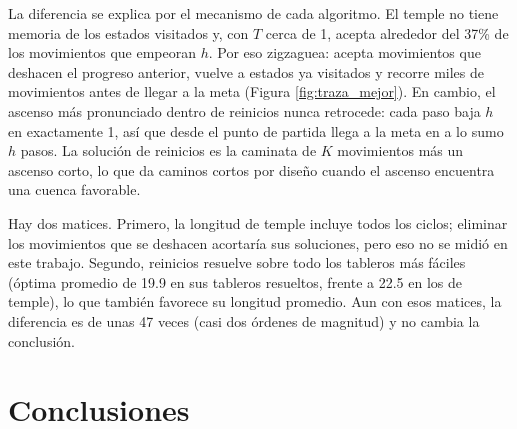 \documentclass[12pt,a4paper]{article}
\begin{document}
La diferencia se explica por el mecanismo de cada algoritmo. El temple
no tiene memoria de los estados visitados y, con $T$ cerca de 1, acepta
alrededor del 37\% de los movimientos que empeoran $h$. Por eso
zigzaguea: acepta movimientos que deshacen el progreso anterior,
vuelve a estados ya visitados y recorre miles de movimientos antes de
llegar a la meta (Figura \ref{fig:traza_mejor}). En cambio, el ascenso
más pronunciado dentro de reinicios nunca retrocede: cada paso baja $h$
en exactamente 1, así que desde el punto de partida llega a la meta en
a lo sumo $h$ pasos. La solución de reinicios es la caminata de $K$
movimientos más un ascenso corto, lo que da caminos cortos por diseño
cuando el ascenso encuentra una cuenca favorable.

Hay dos matices. Primero, la longitud de temple incluye todos los
ciclos; eliminar los movimientos que se deshacen acortaría sus
soluciones, pero eso no se midió en este trabajo. Segundo, reinicios
resuelve sobre todo los tableros más fáciles (óptima promedio de 19.9
en sus tableros resueltos, frente a 22.5 en los de temple), lo que
también favorece su longitud promedio. Aun con esos matices, la
diferencia es de unas 47 veces (casi dos órdenes de magnitud) y no
cambia la conclusión.

\section{Conclusiones}
\end{document}

